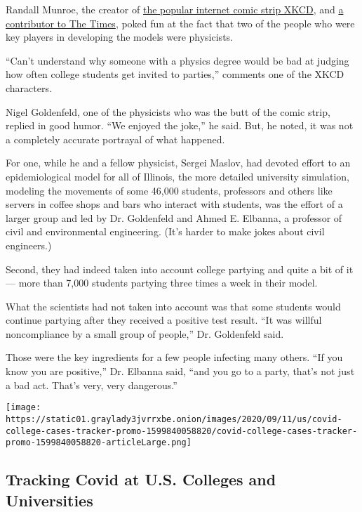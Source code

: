 Randall Munroe, the creator of \href{https://xkcd.com/2355/}{the popular
internet comic strip XKCD}, and
\href{https://www.nytimes3xbfgragh.onion/column/good-question-randall-munroe-xkcd}{a
contributor to The Times}, poked fun at the fact that two of the people
who were key players in developing the models were physicists.

``Can't understand why someone with a physics degree would be bad at
judging how often college students get invited to parties,'' comments
one of the XKCD characters.

Nigel Goldenfeld, one of the physicists who was the butt of the comic
strip, replied in good humor. ``We enjoyed the joke,'' he said. But, he
noted, it was not a completely accurate portrayal of what happened.

For one, while he and a fellow physicist, Sergei Maslov, had devoted
effort to an epidemiological model for all of Illinois, the more
detailed university simulation, modeling the movements of some 46,000
students, professors and others like servers in coffee shops and bars
who interact with students, was the effort of a larger group and led by
Dr. Goldenfeld and Ahmed E. Elbanna, a professor of civil and
environmental engineering. (It's harder to make jokes about civil
engineers.)

Second, they had indeed taken into account college partying and quite a
bit of it --- more than 7,000 students partying three times a week in
their model.

What the scientists had not taken into account was that some students
would continue partying after they received a positive test result. ``It
was willful noncompliance by a small group of people,'' Dr. Goldenfeld
said.

Those were the key ingredients for a few people infecting many others.
``If you know you are positive,'' Dr. Elbanna said, ``and you go to a
party, that's not just a bad act. That's very, very dangerous.''

\href{https://www.nytimes3xbfgragh.onion/interactive/2020/us/covid-college-cases-tracker.html}{}

\texttt{[image: https://static01.graylady3jvrrxbe.onion/images/2020/09/11/us/covid-college-cases-tracker-promo-1599840058820/covid-college-cases-tracker-promo-1599840058820-articleLarge.png]}

\hypertarget{tracking-covid-at-us-colleges-and-universities}{%
\subsection{Tracking Covid at U.S. Colleges and
Universities}\label{tracking-covid-at-us-colleges-and-universities}}


